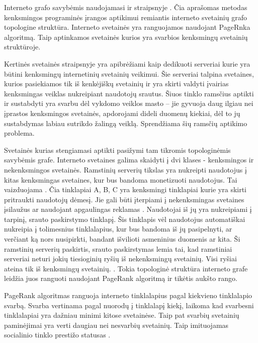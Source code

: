 Interneto grafo savybėmis naudojamasi ir straipsnyje . Čia aprašomas metodas kenksmingos programinės įrangos aptikimui remiantis interneto svetainių grafo topologine struktūra. Interneto svetainės yra ranguojamos naudojant PageRnka algoritmą. Taip aptinkamos svetainės kurios yra svarbios kenksmingų svetainių struktūroje.

Kertinės svetainės straipsnyje \cite{linchpins} yra apibrėžiami kaip dedikuoti serveriai kurie yra būtini kenksmingų internetinių svetainių veikimui. Šie serveriai talpina svetaines, kurios pasiekiamos tik iš kenkėjiškų svetainių ir yra skirti valdyti įvairias kenksmingas veiklas nukreipiant naudotojų srautus. Šiuos tinklo ramsčius aptikti ir sustabdyti yra svarbu dėl vykdomo veiklos masto -- jie gyvuoja daug ilgiau nei įprastos kenksmingos svetainės, apdorojami dideli duomenų kiekiai, dėl to jų sustabdymas labiau sutrikdo žalingą veiklą. Sprendžiama šių ramsčių aptikimo problema.

Svetainės kurias stengiamasi aptikti pasižymi tam tikromis topologinėmis savybėmis grafe. Interneto svetaines galima skaidyti į dvi klases - kenksmingos ir nekenksmingos svetainės. Ramstinių serverių tikslas yra nukreipti naudotojus į kitas kenksmingas svetaines, kur bus bandoma monetizuoti naudotojus. Tai vaizduojama . Čia tinklapiai A, B, C yra kenksmingi tinklapiai kurie yra skirti pritraukti naudotojų dėmesį. Jie gali būti įterpiami į nekenksmingas svetaines įsilaužus ar naudojant apgaulingas reklamas \cite{tax}. Naudotojai iš jų yra nukreipiami į tarpinį, srauto paskirstymo tinklapį. Šis tinklapis vėl naudotojus automatiškai nukreipia į tolimesnius tinklalapius, kur bus bandoma iš jų pasipelnyti, ar verčiant ką nors nusipirkti, bandant išvilioti asmeninius duomenis ar kita. Ši ramstinių serverių paskirtis, srauto paskirstymas lemia tai, kad ramstiniai serveriai neturi jokių tiesioginių ryšių iš nekenksmingų svetainių. Visi ryšiai ateina tik iš kenksmingų svetainių. \cite{linchpins}. Tokia topologinė struktūra interneto grafe leidžia juos ranguoti naudojant PageRank algoritmą ir tikėtis aukšto rango.


PageRank algoritmas ranguoja interneto tinklalapius pagal kiekvieno tinklalapio svarbą. Svarba vertinama pagal nuorodų į tinklalapį kiekį, laikoma kad svarbesni tinklalapiai yra dažniau minimi kitose svetainėse. Taip pat svarbių svetainių paminėjimai yra verti daugiau nei nesvarbių svetainių. Taip imituojamas socialinio tinklo prestižo statusas \cite{Wu2008}.

